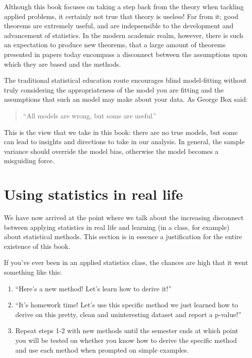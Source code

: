 Although this book focuses on taking a step back from the theory when tackling applied problems, it certainly not true that theory is useless! Far from it; good theorems are extremely useful, and are indepsensible to the development and advancement of statistics. In the modern academic realm, however, there is such an expectation to produce new theorems, that a large amount of theorems presented in papers today encompass a disconnect between the assumptions upon which they are based and the methods.

The traditional statistical education route encourages blind model-fitting without truly considering the appropriateness of the model you are fitting and the assumptions that such an model may make about your data. As George Box said:
\begin{quote}
``All models are wrong, but some are useful.''
\end{quote}


This is the view that we take in this book: there are no true models, but some can lead to insights and directions to take in our analysis. In general, the sample variance should override the model bias, otherwise the model becomes a misguiding force.


\section{Using statistics in real life}

We have now arrived at the point where we talk about the increasing disconnect between applying statistics in real life and learning (in a class, for example) about statistical methods. This section is in essence a justification for the entire existence of this book. 

If you've ever been in an applied statistics class, the chances are high that it went something like this:

\begin{enumerate}
\item ``Here's a new method! Let's learn how to derive it!''
\item ``It's homework time! Let's use this specific method we just learned how to derive on this pretty, clean and uninteresting dataset and report a p-value!''
\item Repeat steps 1-2 with new methods until the semester ends at which point you will be tested on whether you know how to derive the specific method and use each method when prompted on simple examples.
\end{enumerate}


